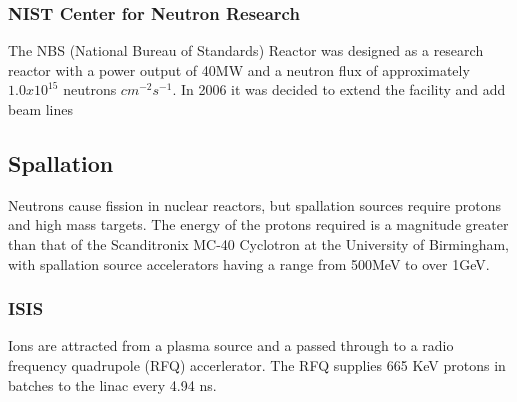 \subsubsection{NIST Center for Neutron Research}

The NBS (National Bureau of Standards) Reactor was designed as a research reactor with a power output of 40MW and a neutron flux of approximately $1.0x10^15$ neutrons $cm^{-2} s^{-1}$.  In 2006 it was decided to extend the facility and add beam lines







\subsection{Spallation}

Neutrons cause fission in nuclear reactors, but spallation sources require protons and high mass targets.  The energy of the protons required is a magnitude greater than that of the Scanditronix MC-40 Cyclotron at the University of Birmingham, with spallation source accelerators having a range from 500MeV to over 1GeV.  



\subsubsection{ISIS}

Ions are attracted from a plasma source and a passed through to a radio frequency quadrupole (RFQ) accerlerator.  The RFQ supplies 665 KeV protons in batches to the linac every 4.94 ns.



